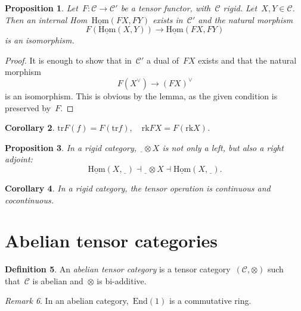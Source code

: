 \documentclass[a4paper,english,12pt]{scrartcl}
\theoremstyle{definition}
\newtheorem{defn}{Definition}[section]
\theoremstyle{plain}
\newtheorem{prop}[defn]{Proposition}
\newtheorem{cor}[defn]{Corollary}
\theoremstyle{remark}
\newtheorem{rem}[defn]{Remark}
\newcommand{\C}{\mathcal{C}}
\renewcommand{\_}{\mathpunct{.}\,}
\newcommand{\?}{\,{:}\,}
\newcommand{\Hom}{\underline{\mathrm{Hom}}}
\newcommand{\End}{\mathrm{End}}
\newcommand{\freist}{\underline{\ \ }}
\newcommand{\tr}{\mathrm{tr}}
\newcommand{\rk}{\mathrm{rk}}
\begin{document}
\begin{prop}Let~$F : \C \to \C'$ be a tensor functor, with~$\C$ rigid.
Let~$X,Y \in \C$. Then an internal Hom~$\Hom(FX,FY)$ exists in~$\C'$ and the
natural morphism
\[ F(\Hom(X,Y)) \longrightarrow \Hom(FX,FY) \]
is an isomorphism.\end{prop}
\begin{proof}It is enough to show that in~$\C'$ a dual of~$FX$ exists and that
the natural morphism
\[ F(X^\vee) \longrightarrow (FX)^\vee \]
is an isomorphism. This is obvious by the lemma, as the given condition is
preserved by~$F$.\end{proof}

\begin{cor}$\tr F(f) = F(\tr f), \quad \rk FX = F(\rk X)$.\end{cor}

\begin{prop}In a rigid category, $\freist \otimes X$ is not only a left, but
also a right adjoint:
\[ \Hom(X,\freist) \dashv \freist \otimes X \dashv \Hom(X,\freist). \]
\end{prop}
\begin{cor}In a rigid category, the tensor operation is continuous and
cocontinuous.\end{cor}


\section{Abelian tensor categories}

\begin{defn}An \emph{abelian tensor category} is a tensor
category~$(\C,\otimes)$ such that~$\C$ is abelian and~$\otimes$ is
bi-additive.\end{defn}

\begin{rem}In an abelian category,~$\End(1)$ is a commutative ring.\end{rem}
\end{document}
